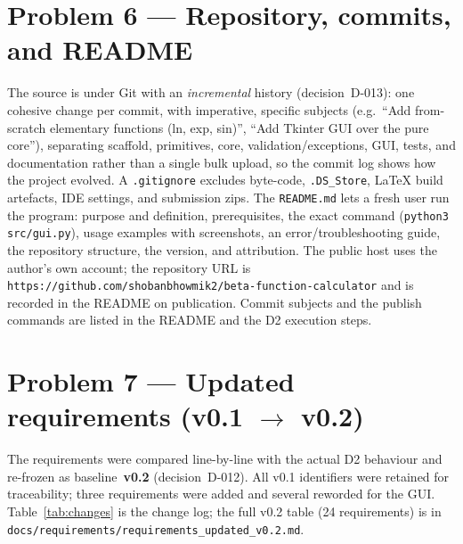 \documentclass[11pt,a4paper]{article}
\begin{document}
\section{Problem 6 --- Repository, commits, and README}
\label{sec:p6}
The source is under Git with an \emph{incremental} history (decision~D-013): one
cohesive change per commit, with imperative, specific subjects (e.g.\ ``Add
from-scratch elementary functions (ln, exp, sin)'', ``Add Tkinter GUI over the
pure core''), separating scaffold, primitives, core, validation/exceptions, GUI,
tests, and documentation rather than a single bulk upload, so the commit log shows
how the project evolved. A \texttt{.gitignore} excludes byte-code, \texttt{.DS\_Store},
LaTeX build artefacts, IDE settings, and submission zips. The \texttt{README.md}
lets a fresh user run the program: purpose and definition, prerequisites, the
exact command (\texttt{python3 src/gui.py}), usage examples with screenshots, an
error/troubleshooting guide, the repository structure, the version, and
attribution. The public host uses the author's own account; the repository URL is
\texttt{https://github.com/shobanbhowmik2/beta-function-calculator} and is recorded in the README on publication. Commit
subjects and the publish commands are listed in the README and the D2 execution
steps.

\section{Problem 7 --- Updated requirements (v0.1 $\rightarrow$ v0.2)}
\label{sec:p7}
The requirements were compared line-by-line with the actual D2 behaviour and
re-frozen as baseline~\textbf{v0.2} (decision~D-012). All v0.1 identifiers were
retained for traceability; three requirements were added and several reworded for
the GUI. Table~\ref{tab:changes} is the change log; the full v0.2 table (24
requirements) is in \texttt{docs/requirements/requirements\_updated\_v0.2.md}.
\end{document}

